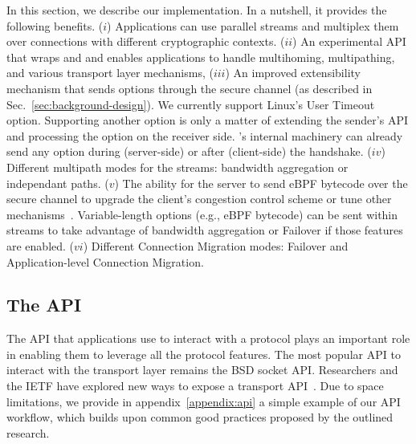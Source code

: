 \label{sec:content}

In this section, we describe our \tcpls implementation. In a nutshell, it provides the following benefits.
($i$) Applications can use parallel streams and multiplex them over \tcp connections with different cryptographic contexts.
($ii$) An experimental API that wraps \tls and \tcp and enables applications to
    handle multihoming, multipathing, and various transport layer mechanisms,
($iii$) An improved \tcp extensibility mechanism that sends \tcp options
   through the secure \tcpls channel (as described in
   Sec.~\ref{sec:background-design}). We currently support Linux's \tcp User Timeout option. Supporting another \tcp option is only a matter of extending the
sender's API and processing the option on the receiver side. \tcpls's
internal machinery can already send any \tcp option during (server-side) or
after (client-side) the \tcp handshake.
($iv$) Different multipath modes for the \tcpls streams: bandwidth aggregation or independant paths.
($v$) The ability for the server to send eBPF bytecode over the secure
  channel to upgrade the client's \tcp congestion control scheme or
  tune other \tcp mechanisms~\cite{brakmo2017tcp,tran2019beyond}.
  Variable-length options (e.g., eBPF bytecode) can be sent within streams to
  take advantage of bandwidth aggregation or Failover if those features are
  enabled.
($vi$) Different Connection Migration modes: Failover and Application-level
Connection Migration.



\subsection{The \tcpls API}

The API that applications use to interact with a protocol plays an important
role in enabling them to leverage all the protocol features. The most popular
API to interact with the transport layer remains the BSD socket API. Researchers
and the IETF have explored new ways to expose a transport
API~\cite{draft-ietf-taps-arch,hruby2014sockets,rfc6458,schmidt2013socket}.
Due to space limitations, we provide in appendix~\ref{appendix:api} a simple example of our API workflow,
which builds upon common good practices proposed by the outlined research.

